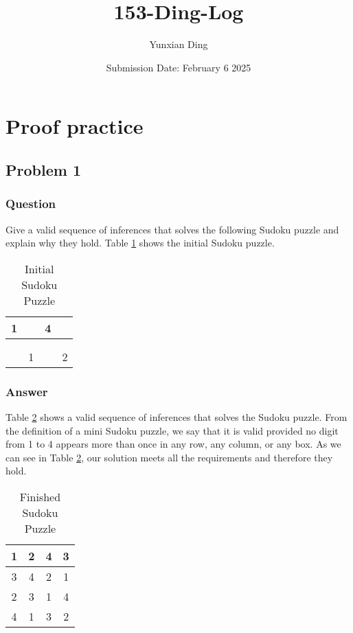 \documentclass{article}
\title{153-Ding-Log}
\author{Yunxian Ding}
\date{Submission Date: February 6 2025}
\begin{document}
\maketitle
\section{Proof practice}

\subsection{Problem 1} 
\subsubsection{Question} Give a valid sequence of inferences that solves the following Sudoku puzzle and explain why they hold.
Table \ref{table1:data1} shows the initial Sudoku puzzle.
\begin{table}[h!]
\centering
\begin{tabular}{|c|c|c|c|} 
 \hline
 1 &  & 4 &  \\ 
 \hline
  &  &  &  \\  
 \hline
  &  &  &  \\
 \hline
  & 1 &  & 2 \\
 \hline
\end{tabular}
\caption{Initial Sudoku Puzzle}
\label{table1:data1}
\end{table}

\subsubsection{Answer} Table \ref{table2:data2} shows a valid sequence of inferences that solves the Sudoku puzzle. From the definition of a mini Sudoku puzzle, we say that it is valid provided no digit from 1 to 4 appears more than once in any row, any column, or any box. As we can see in Table \ref{table2:data2}, our solution meets all the requirements and therefore they hold.
\begin{table}[h!]
\centering
\begin{tabular}{|c|c|c|c|} 
 \hline
 1 & 2 & 4 & 3 \\ 
 \hline
 3 & 4 & 2 & 1 \\  
 \hline
 2 & 3 & 1 & 4 \\
 \hline
 4 & 1 & 3 & 2 \\
 \hline
\end{tabular}
\caption{Finished Sudoku Puzzle}
\label{table2:data2}
\end{table}
\end{document}
